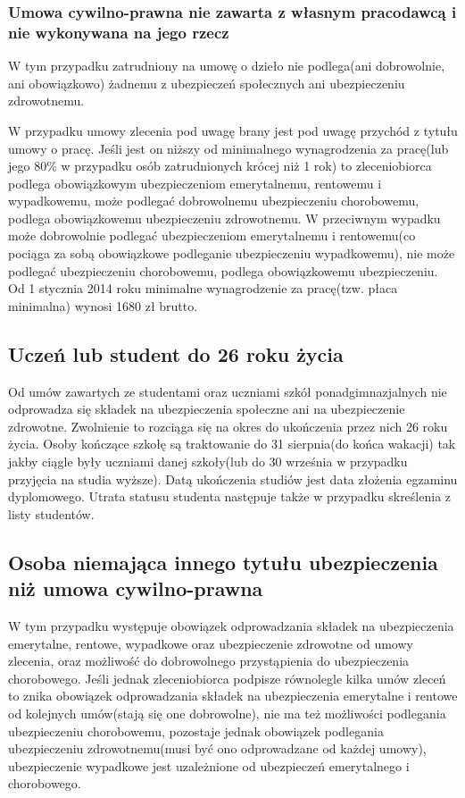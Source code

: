 \subsubsection{Umowa cywilno-prawna nie zawarta z własnym pracodawcą i nie wykonywana na jego rzecz}
W tym przypadku zatrudniony na umowę o dzieło nie podlega(ani dobrowolnie, ani obowiązkowo) żadnemu z ubezpieczeń społecznych ani ubezpieczeniu zdrowotnemu. 

W przypadku umowy zlecenia pod uwagę brany jest pod uwagę przychód z tytułu umowy o pracę. Jeśli jest on niższy od minimalnego wynagrodzenia za pracę(lub jego 80\% w przypadku osób zatrudnionych krócej niż 1 rok) to zleceniobiorca podlega obowiązkowym ubezpieczeniom emerytalnemu, rentowemu i wypadkowemu, może podlegać dobrowolnemu ubezpieczeniu chorobowemu, podlega obowiązkowemu ubezpieczeniu zdrowotnemu. W przeciwnym wypadku może dobrowolnie podlegać ubezpieczeniom emerytalnemu i rentowemu(co pociąga za sobą obowiązkowe podleganie ubezpieczeniu wypadkowemu), nie może podlegać ubezpieczeniu chorobowemu, podlega obowiązkowemu ubezpieczeniu. Od 1 stycznia 2014 roku minimalne wynagrodzenie za pracę(tzw. płaca minimalna) wynosi 1680 zł brutto.

\subsection[Uczeń lub student do 26 roku życia][Uczeń lub student do 26 roku życia]{Uczeń lub student do 26 roku życia}
Od umów zawartych ze studentami oraz uczniami szkół ponadgimnazjalnych nie odprowadza się składek na ubezpieczenia społeczne ani na ubezpieczenie zdrowotne. Zwolnienie to rozciąga się na okres do ukończenia przez nich 26 roku życia. Osoby kończące szkołę są traktowanie do 31 sierpnia(do końca wakacji)  tak jakby ciągle były uczniami danej szkoły(lub do 30 września w przypadku przyjęcia na studia wyższe). Datą ukończenia studiów jest data złożenia egzaminu dyplomowego. Utrata statusu studenta następuje także w przypadku skreślenia z listy studentów.

\subsection[Osoba niemająca innego tytułu ubezpieczenia niż umowa cywilno-prawna][Osoba niemająca innego tytułu ubezpieczenia niż umowa cywilno-prawna]{Osoba niemająca innego tytułu ubezpieczenia niż umowa cywilno-prawna}
\label{inni}
W tym przypadku występuje obowiązek odprowadzania składek na ubezpieczenia emerytalne, rentowe, wypadkowe oraz ubezpieczenie zdrowotne od umowy zlecenia, oraz możliwość do dobrowolnego przystąpienia do ubezpieczenia chorobowego. Jeśli jednak zleceniobiorca podpisze równolegle kilka umów zleceń to znika obowiązek odprowadzania składek na ubezpieczenia emerytalne i rentowe od kolejnych umów(stają się one dobrowolne), nie ma też możliwości podlegania ubezpieczeniu chorobowemu, pozostaje jednak obowiązek podlegania ubezpieczeniu zdrowotnemu(musi być ono odprowadzane od każdej umowy), ubezpieczenie wypadkowe jest uzależnione od ubezpieczeń emerytalnego i chorobowego.

